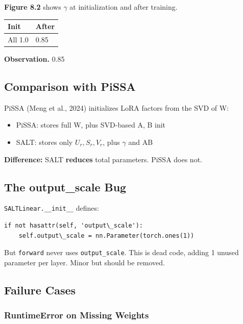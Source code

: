 \textbf{Figure 8.2} shows $\gamma$ at initialization and after training.

\begin{table}[H]
\centering
\small
\begin{tabular}{ll}
\toprule
\textbf{Init} & \textbf{After} \\
\midrule
All 1.0 & 0.85 \\
\bottomrule
\end{tabular}
\end{table}

\textbf{Observation.} 0.85

\subsection{Comparison with PiSSA}

PiSSA (Meng et al., 2024) initializes LoRA factors from the SVD of W:

\begin{itemize}
\item PiSSA: stores full W, plus SVD-based A, B init
\item SALT: stores only $U_r, S_r, V_r$, plus $\gamma$ and AB

\end{itemize}
\textbf{Difference:} SALT \textbf{reduces} total parameters. PiSSA does not.

\subsection{The output\_scale Bug}

\texttt{SALTLinear.\_\_init\_\_} defines:

\begin{lstlisting}
if not hasattr(self, 'output\_scale'):
    self.output\_scale = nn.Parameter(torch.ones(1))
\end{lstlisting}

But \texttt{forward} never uses \texttt{output\_scale}. This is dead code, adding 1 unused 
parameter per layer. Minor but should be removed.

\subsection{Failure Cases}

\subsubsection{RuntimeError on Missing Weights}

